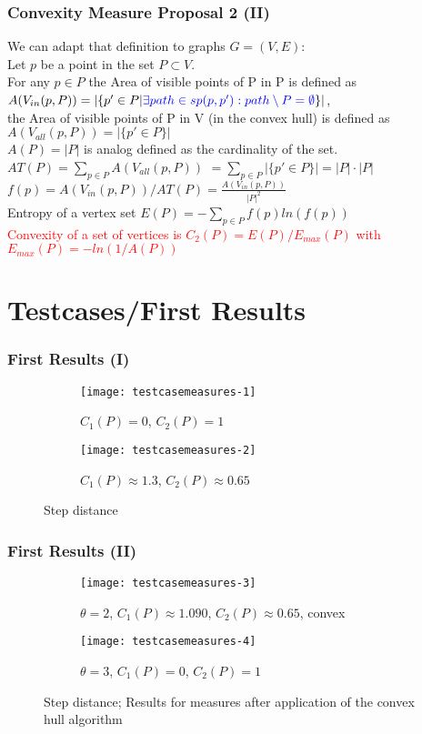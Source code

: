 \documentclass[
    11pt, %
    aspectratio=169, %
    handout
]{beamer}
\begin{document}
\begin{frame}
\frametitle{Convexity Measure Proposal 2 (II)}
We can adapt that definition to graphs $G=(V,E)$: \\
Let $p$ be a point in the set $P \subset V$. \\ \pause
For any $p \in P$ the Area of visible points of P in P is defined as $A(V_{in}(p,P))=|\{p' \in P | \textcolor{blue}{\exists path \in sp(p, p'): path \setminus P = \emptyset}\}|$, \\ \pause
the Area of visible points of P in V (in the convex hull) is defined as $A(V_{all}(p,P))=|\{p' \in P \}|$\\ \pause
$A(P)=|P|$ is analog defined as the cardinality of the set. \\ \pause
$AT(P)=\underset{p \in P}{\sum} A(V_{all}(p,P))$ \pause
$=\underset{p \in P}{\sum} |\{p' \in P \}| = |P| \cdot |P|$ \\ \pause
$f(p) = A(V_{in}(p,P))/AT(P) = \frac{A(V_{in}(p,P))}{|P|^2}$ \\ \pause
Entropy of a vertex set $ E(P) = -\underset{p \in P}{\sum} f(p) ln (f(p))$ \\
\pause
\textcolor{red}{Convexity of a set of vertices is $C_2(P) = E(P) / E_{max}(P)$ with $E_{max}(P) = -ln(1/A(P))$}\\
\end{frame}
\section{Testcases/First Results}
\begin{frame}
\frametitle{First Results (I)}
\begin{figure}
\centering
\begin{subfigure}{0.4\textwidth}
    \texttt{[image: testcasemeasures-1]}
    \caption{$C_1(P)=0$, $C_2(P)=1$}
    \label{fig:first}
\end{subfigure}
\hfill
\begin{subfigure}{0.4\textwidth}
    \texttt{[image: testcasemeasures-2]}
    \caption{$C_1(P) \approx 1.3$, $C_2(P) \approx 0.65$}
    \label{fig:second}
\end{subfigure}
\caption{Step distance}
\end{figure}
\end{frame}

\begin{frame}
\frametitle{First Results (II)}
\begin{figure}
\centering
\begin{subfigure}{0.4\textwidth}
    \texttt{[image: testcasemeasures-3]}
    \caption{$\theta=2$, $C_1(P) \approx 1.090 $, $C_2(P) \approx 0.65$, convex}
    \label{fig:first}
\end{subfigure}
\hfill
\begin{subfigure}{0.4\textwidth}
    \texttt{[image: testcasemeasures-4]}
    \caption{$\theta=3$, $C_1(P) = 0$, $C_2(P) = 1$}
    \label{fig:second}
\end{subfigure}
\caption{Step distance; Results for measures after application of the convex hull algorithm}
\end{figure}
\end{frame}
\end{document}
